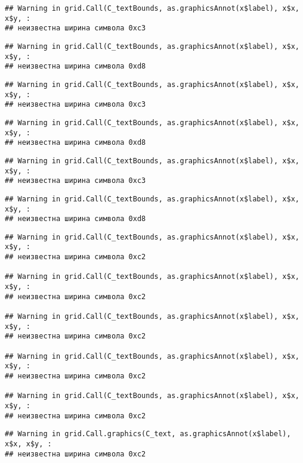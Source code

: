 \documentclass[
]{article}
\begin{document}
\begin{verbatim}
## Warning in grid.Call(C_textBounds, as.graphicsAnnot(x$label), x$x, x$y, :
## неизвестна ширина символа 0xc3
\end{verbatim}

\begin{verbatim}
## Warning in grid.Call(C_textBounds, as.graphicsAnnot(x$label), x$x, x$y, :
## неизвестна ширина символа 0xd8
\end{verbatim}

\begin{verbatim}
## Warning in grid.Call(C_textBounds, as.graphicsAnnot(x$label), x$x, x$y, :
## неизвестна ширина символа 0xc3
\end{verbatim}

\begin{verbatim}
## Warning in grid.Call(C_textBounds, as.graphicsAnnot(x$label), x$x, x$y, :
## неизвестна ширина символа 0xd8
\end{verbatim}

\begin{verbatim}
## Warning in grid.Call(C_textBounds, as.graphicsAnnot(x$label), x$x, x$y, :
## неизвестна ширина символа 0xc3
\end{verbatim}

\begin{verbatim}
## Warning in grid.Call(C_textBounds, as.graphicsAnnot(x$label), x$x, x$y, :
## неизвестна ширина символа 0xd8
\end{verbatim}

\begin{verbatim}
## Warning in grid.Call(C_textBounds, as.graphicsAnnot(x$label), x$x, x$y, :
## неизвестна ширина символа 0xc2

## Warning in grid.Call(C_textBounds, as.graphicsAnnot(x$label), x$x, x$y, :
## неизвестна ширина символа 0xc2

## Warning in grid.Call(C_textBounds, as.graphicsAnnot(x$label), x$x, x$y, :
## неизвестна ширина символа 0xc2

## Warning in grid.Call(C_textBounds, as.graphicsAnnot(x$label), x$x, x$y, :
## неизвестна ширина символа 0xc2

## Warning in grid.Call(C_textBounds, as.graphicsAnnot(x$label), x$x, x$y, :
## неизвестна ширина символа 0xc2
\end{verbatim}

\begin{verbatim}
## Warning in grid.Call.graphics(C_text, as.graphicsAnnot(x$label), x$x, x$y, :
## неизвестна ширина символа 0xc2
\end{verbatim}
\end{document}
